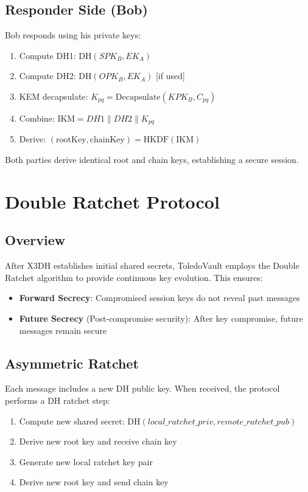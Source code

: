 \documentclass[12pt,a4paper]{article}
\begin{document}
\subsection{Responder Side (Bob)}

Bob responds using his private keys:

\begin{enumerate}
    \item Compute DH1: $\text{DH}(SPK_B, EK_A)$
    \item Compute DH2: $\text{DH}(OPK_B, EK_A)$ [if used]
    \item KEM decapsulate: $K_{pq} = \text{Decapsulate}(KPK_B, C_{pq})$
    \item Combine: $\text{IKM} = DH1 \| DH2 \| K_{pq}$
    \item Derive: $(\text{rootKey}, \text{chainKey}) = \text{HKDF}(\text{IKM})$
\end{enumerate}

Both parties derive identical root and chain keys, establishing a secure session.

\section{Double Ratchet Protocol}

\subsection{Overview}

After X3DH establishes initial shared secrets, ToledoVault employs the Double Ratchet algorithm to provide continuous key evolution. This ensures:

\begin{itemize}
    \item \textbf{Forward Secrecy}: Compromised session keys do not reveal past messages
    \item \textbf{Future Secrecy} (Post-compromise security): After key compromise, future messages remain secure
\end{itemize}

\subsection{Asymmetric Ratchet}

Each message includes a new DH public key. When received, the protocol performs a DH ratchet step:

\begin{enumerate}
    \item Compute new shared secret: $\text{DH}(local\_ratchet\_priv, remote\_ratchet\_pub)$
    \item Derive new root key and receive chain key
    \item Generate new local ratchet key pair
    \item Derive new root key and send chain key
\end{enumerate}
\end{document}
